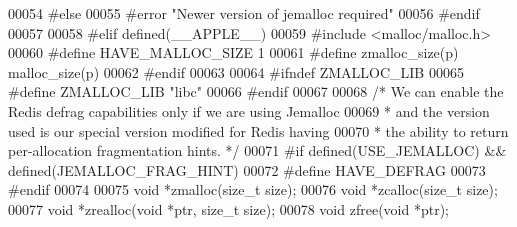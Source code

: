 \begin{DoxyCode}
00054 \textcolor{preprocessor}{#}\textcolor{preprocessor}{else}
00055 \textcolor{preprocessor}{#}\textcolor{preprocessor}{error} \textcolor{stringliteral}{"Newer version of jemalloc required"}
00056 \textcolor{preprocessor}{#}\textcolor{preprocessor}{endif}
00057 
00058 \textcolor{preprocessor}{#}\textcolor{preprocessor}{elif} \textcolor{preprocessor}{defined}\textcolor{preprocessor}{(}\textcolor{preprocessor}{\_\_APPLE\_\_}\textcolor{preprocessor}{)}
00059 \textcolor{preprocessor}{#}\textcolor{preprocessor}{include} \textcolor{preprocessor}{<}\textcolor{preprocessor}{malloc}\textcolor{preprocessor}{/}\textcolor{preprocessor}{malloc}\textcolor{preprocessor}{.}\textcolor{preprocessor}{h}\textcolor{preprocessor}{>}
00060 \textcolor{preprocessor}{#}\textcolor{preprocessor}{define} \textcolor{preprocessor}{HAVE\_MALLOC\_SIZE} 1
00061 \textcolor{preprocessor}{#}\textcolor{preprocessor}{define} \textcolor{preprocessor}{zmalloc\_size}\textcolor{preprocessor}{(}\textcolor{preprocessor}{p}\textcolor{preprocessor}{)} \textcolor{preprocessor}{malloc\_size}\textcolor{preprocessor}{(}\textcolor{preprocessor}{p}\textcolor{preprocessor}{)}
00062 \textcolor{preprocessor}{#}\textcolor{preprocessor}{endif}
00063 
00064 \textcolor{preprocessor}{#}\textcolor{preprocessor}{ifndef} \textcolor{preprocessor}{ZMALLOC\_LIB}
00065 \textcolor{preprocessor}{#}\textcolor{preprocessor}{define} \textcolor{preprocessor}{ZMALLOC\_LIB} \textcolor{stringliteral}{"libc"}
00066 \textcolor{preprocessor}{#}\textcolor{preprocessor}{endif}
00067 
00068 \textcolor{comment}{/* We can enable the Redis defrag capabilities only if we are using Jemalloc}
00069 \textcolor{comment}{ * and the version used is our special version modified for Redis having}
00070 \textcolor{comment}{ * the ability to return per-allocation fragmentation hints. */}
00071 \textcolor{preprocessor}{#}\textcolor{preprocessor}{if} \textcolor{preprocessor}{defined}\textcolor{preprocessor}{(}\textcolor{preprocessor}{USE\_JEMALLOC}\textcolor{preprocessor}{)} \textcolor{preprocessor}{&&} \textcolor{preprocessor}{defined}\textcolor{preprocessor}{(}\textcolor{preprocessor}{JEMALLOC\_FRAG\_HINT}\textcolor{preprocessor}{)}
00072 \textcolor{preprocessor}{#}\textcolor{preprocessor}{define} \textcolor{preprocessor}{HAVE\_DEFRAG}
00073 \textcolor{preprocessor}{#}\textcolor{preprocessor}{endif}
00074 
00075 \textcolor{keywordtype}{void} *zmalloc(size\_t size);
00076 \textcolor{keywordtype}{void} *zcalloc(size\_t size);
00077 \textcolor{keywordtype}{void} *zrealloc(\textcolor{keywordtype}{void} *ptr, size\_t size);
00078 \textcolor{keywordtype}{void} zfree(\textcolor{keywordtype}{void} *ptr);

\end{DoxyCode}
